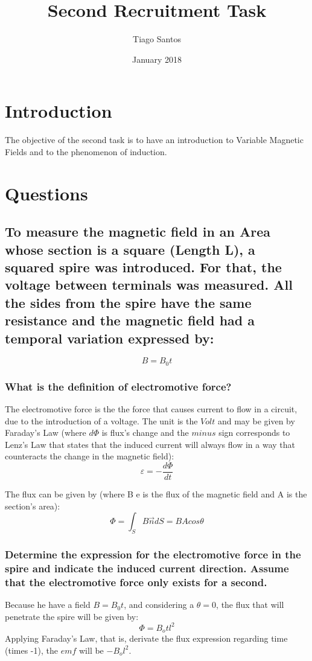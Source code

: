 \documentclass[a4paper,12pt]{article}
\begin{document}
\title{\textbf{Second Recruitment Task}}
\author{Tiago Santos}
\date{January 2018}
\maketitle
\section{Introduction} 
\hspace{1cm}The objective of the second task is to have an introduction to Variable Magnetic Fields and to the phenomenon of induction.
\section{Questions}
\subsection{To measure the magnetic field in an Area whose section is a square (Length L), a squared spire was introduced. For that, the voltage between terminals was measured. All the sides from the spire have the same resistance and the magnetic field had a temporal variation expressed by:}
\begin{equation}
\mathit{B} = B_{0}\textit{t}
\end{equation}
\subsubsection{What is the definition of electromotive force?}
\hspace{1cm}	The electromotive force is the the force that causes current to flow in a circuit, due to the introduction of a voltage. The unit is the $Volt$ and may be given by Faraday's Law (where $d\Phi$ is flux's change and the $minus$ sign corresponds to Lenz's Law that states that the induced current will always flow in a way that counteracts the change in the magnetic field):
\begin{equation}
\varepsilon = -\frac{d\Phi }{dt}
\end{equation}

The flux can be given by (where B e is the flux of the magnetic field and A is the section's area):
\begin{equation}
\Phi = \int_SB\vec{n}dS =BAcos\theta 
\end{equation}

\subsubsection{Determine the expression for the electromotive force in the spire and indicate the induced current direction. Assume that the electromotive force only exists for a second.}
\hspace{1cm} 
Because he have a field $B = B_0 t$, and considering a $\theta = 0$, the flux that will penetrate the spire will be given by: 
\begin{equation}
\Phi = B_o tl^2
\end{equation}
Applying Faraday's Law, that is, derivate the flux expression regarding time (times -1), the $emf$ will be $-B_o l^2$. 
\end{document}
